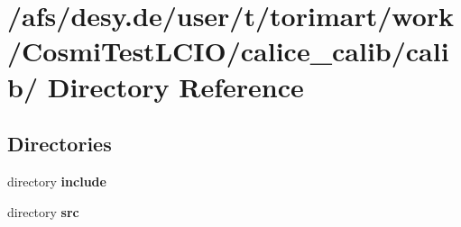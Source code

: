 \section{/afs/desy.de/user/t/torimart/work/CosmiTestLCIO/calice\_\-calib/calib/ Directory Reference}
\label{dir_fea92f6f86d4acd59ef65c817f65f9e0}
\subsection*{Directories}
\begin{DoxyCompactItemize}
\item 
directory {\bf include}
\item 
directory {\bf src}
\end{DoxyCompactItemize}
